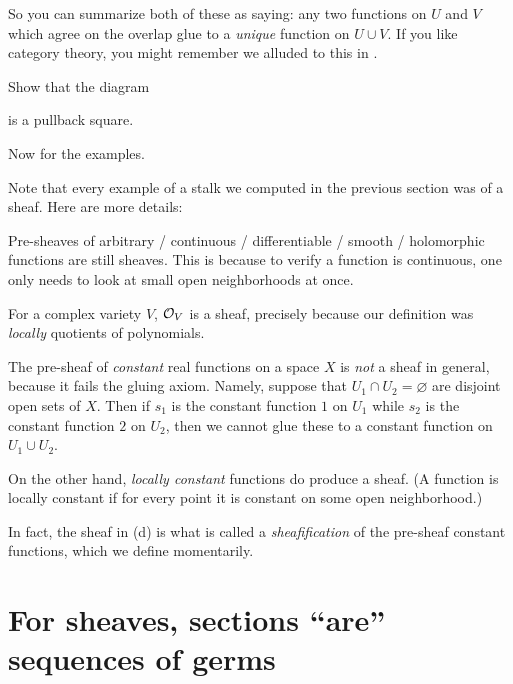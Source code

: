 So you can summarize both of these as saying:
any two functions on $U$ and $V$
which agree on the overlap
glue to a \emph{unique} function on $U \cup V$.
If you like category theory,
you might remember we alluded to this in .
\begin{exercise}
	Show that the diagram
	\begin{center}
	\end{center}
	is a pullback square.
\end{exercise}

Now for the examples.
\begin{example}
	Note that every example of a stalk we computed
	in the previous section was of a sheaf.
	Here are more details:
	\begin{enumerate}[(a)]
		\ii Pre-sheaves of arbitrary / continuous / differentiable / smooth
		/ holomorphic functions are still sheaves.
		This is because to verify a function is continuous,
		one only needs to look at small open neighborhoods at once.
		
		\ii For a complex variety $V$, $\mathcal O_V$ is a sheaf,
		precisely because our definition was \emph{locally} quotients
		of polynomials.

		\ii The pre-sheaf of \emph{constant} real functions on a space $X$
		is \emph{not} a sheaf in general, because it fails the gluing axiom.
		Namely, suppose that $U_1 \cap U_2 = \varnothing$
		are disjoint open sets of $X$.
		Then if $s_1$ is the constant function $1$ on $U_1$
		while $s_2$ is the constant function $2$ on $U_2$,
		then we cannot glue these to a constant function on $U_1 \cup U_2$.

		\ii On the other hand, \emph{locally constant} functions
		do produce a sheaf. (A function is locally constant
		if for every point it is constant on some open neighborhood.)
	\end{enumerate}
	In fact, the sheaf in (d) is what is called a \emph{sheafification}
	of the pre-sheaf constant functions, which we define momentarily.
\end{example}

\section{For sheaves, sections ``are'' sequences of germs}

